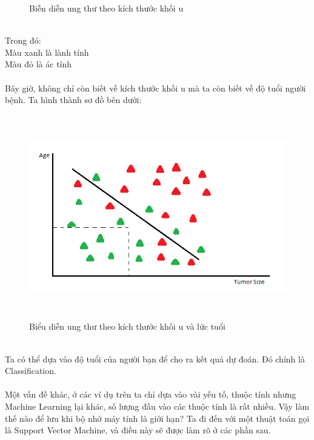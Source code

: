 \begin{itemize}
\begin{figure}[h!]
	\caption{Biễn diễn ung thư theo kích thước khối u}
\end{figure}\\
	Trong đó:\\
	\tab Màu xanh là lành tính\\
	\tab Màu đỏ là ác tính\\\\
	Bây giờ, không chỉ còn biết về kích thước khối u mà ta còn biết về độ tuổi
	người bệnh. Ta hình thành sơ đồ bên dưới:\\
	 \begin{figure}[h!]
  	\centering
	\includegraphics[width=5in,height=3.5in,keepaspectratio=true]{PhanLoai2.png}
	\caption{Biểu diễn ung thư theo kích thước khối u và lức tuổi}
\end{figure}\\
Ta có thể dựa vào độ tuổi của người bạn để cho ra kết quả dự đoán. Đó chính là
Classification.\\\\
Một vấn đề khác, ở các ví dụ trên ta chỉ dựa vào vài yếu tố, thuộc tính nhưng
Machine Learning lại khác, số lượng đầu vào các thuộc tính là rất nhiều. Vậy làm
thế nào để lưu khi bộ nhớ máy tính là giới hạn? Ta đi đến với một thuật toán gọi
là Support Vector Machine, và điều này sẽ được làm rõ ở các phần sau.
\end{itemize}
